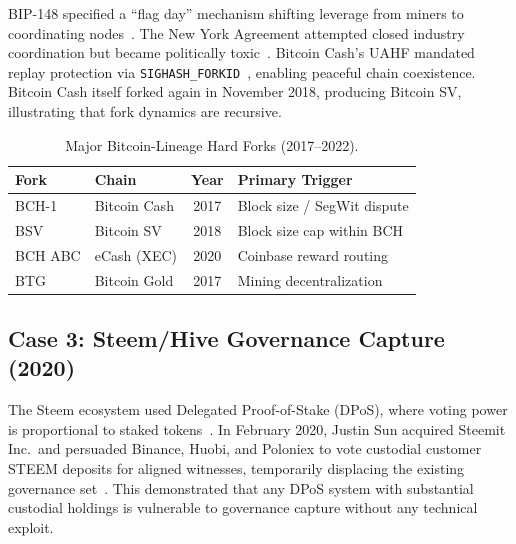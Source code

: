 \documentclass[sigconf,nonacm]{acmart}
\begin{document}
BIP-148 specified a ``flag day'' mechanism shifting leverage from miners to coordinating
nodes~\cite{bip148}. The New York Agreement attempted closed industry coordination but
became politically toxic~\cite{dcg-nya}. Bitcoin Cash's UAHF mandated replay protection
via \texttt{SIGHASH\_FORKID}~\cite{uahf-spec}, enabling peaceful chain coexistence.
Bitcoin Cash itself forked again in November 2018, producing Bitcoin SV, illustrating
that fork dynamics are recursive.

\begin{table}[h]
\caption{Major Bitcoin-Lineage Hard Forks (2017--2022).}
\label{tab:btc-forks}
\small
\begin{tabularx}{\columnwidth}{@{}lXcX@{}}
\toprule
\textbf{Fork} & \textbf{Chain} & \textbf{Year} & \textbf{Primary Trigger} \\
\midrule
BCH-1    & Bitcoin Cash  & 2017 & Block size / SegWit dispute \\
BSV      & Bitcoin SV    & 2018 & Block size cap within BCH   \\
BCH ABC  & eCash (XEC)   & 2020 & Coinbase reward routing     \\
BTG      & Bitcoin Gold  & 2017 & Mining decentralization     \\
\bottomrule
\end{tabularx}
\end{table}

\subsection{Case 3: Steem/Hive Governance Capture (2020)}
\label{sec:hive}

The Steem ecosystem used Delegated Proof-of-Stake (DPoS), where voting power is
proportional to staked tokens~\cite{binance-dpos}. In February 2020, Justin Sun acquired
Steemit Inc.\ and persuaded Binance, Huobi, and Poloniex to vote custodial customer STEEM
deposits for aligned witnesses, temporarily displacing the existing governance
set~\cite{el-amine2022,knight-steemit}. This demonstrated that any DPoS system with
substantial custodial holdings is vulnerable to governance capture without any technical
exploit.
\end{document}
